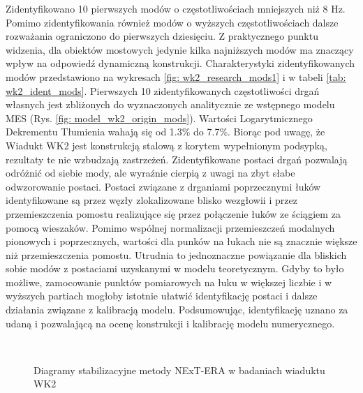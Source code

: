  Zidentyfikowano 10 pierwszych modów o częstotliwościach mniejszych niż 8 Hz. Pomimo zidentyfikowania również modów o wyższych częstotliwościach dalsze rozważania ograniczono do pierwszych dziesięciu. Z praktycznego punktu widzenia, dla obiektów mostowych jedynie kilka najniższych modów ma znaczący wpływ na odpowiedź dynamiczną konstrukcji. Charakterystyki zidentyfikowanych modów przedstawiono na wykresach \ref{fig: wk2_research_mods1} i w tabeli \ref{tab: wk2_ident_mods}. Pierwszych 10 zidentyfikowanych częstotliwości drgań własnych jest zbliżonych do wyznaczonych analitycznie ze wstępnego modelu MES (Rys. \ref{fig: model_wk2_origin_mods}). Wartości Logarytmicznego Dekrementu Tłumienia wahają się od 1.3\% do 7.7\%. Biorąc pod uwagę, że Wiadukt WK2 jest konstrukcją stalową z korytem wypełnionym podsypką, rezultaty te nie wzbudzają zastrzeżeń. Zidentyfikowane postaci drgań pozwalają odróżnić od siebie mody, ale wyraźnie cierpią z uwagi na zbyt słabe odwzorowanie postaci. Postaci związane z drganiami poprzecznymi łuków identyfikowane są przez węzły zlokalizowane blisko wezgłowii i przez przemieszczenia pomostu realizujące się przez połączenie łuków ze ściągiem za pomocą wieszaków. Pomimo wspólnej normalizacji przemieszczeń modalnych pionowych i poprzecznych, wartości dla punków na łukach nie są znacznie większe niż przemieszczenia pomostu. Utrudnia to jednoznaczne powiązanie dla bliskich sobie modów z postaciami uzyskanymi w modelu teoretycznym. Gdyby to było możliwe, zamocowanie punktów pomiarowych na łuku w większej liczbie i w wyższych partiach mogłoby istotnie ułatwić identyfikację postaci i dalsze działania związane z kalibracją modelu. Podsumowując, identyfikację uznano za udaną i pozwalającą na ocenę konstrukcji i kalibrację modelu numerycznego.

\begin{figure}[]
	\centering
	\\
	\captionsetup{justification=centering}
	\caption{Diagramy stabilizacyjne metody NExT-ERA w badaniach wiaduktu WK2}
	\label{fig: wk2_research_stabdiags}
\end{figure}

